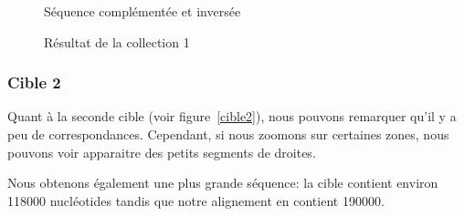 \begin{figure}[!ht]
\begin{minipage}[c]{.46 \linewidth}
\begin{center}
			 Séquence complémentée et inversée
		\end{center}
	\end{minipage}
	\caption{Résultat de la collection 1}
	\label{cible1}
\end{figure}

\FloatBarrier

\subsubsection*{Cible 2}

Quant à la seconde cible (voir figure~\ref{cible2}), nous pouvons remarquer qu'il y a peu de
correspondances. Cependant, si nous zoomons sur certaines zones, nous pouvons
voir apparaitre des petits segments de droites.

Nous obtenons également une plus grande séquence: la cible contient environ
118000 nucléotides tandis que notre alignement en contient 190000.

